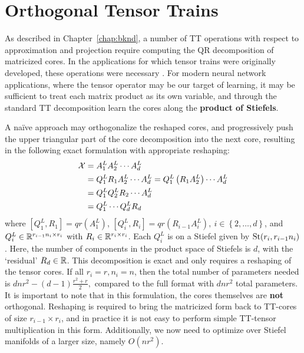 \section{Orthogonal Tensor Trains}\label{sec:ott}
As described in Chapter~\ref{chap:bknd}, a number of TT operations with respect to approximation and projection require computing the QR decomposition of matricized cores. In the applications for which tensor trains were originally developed, these operations were necessary \citep{oseledets2011tensor,klus2018tensor}. For modern neural network applications, where the tensor operator may be our target of learning, it may be sufficient to treat each matrix product as its own variable, and through the standard TT decomposition learn the cores along the \textbf{product of Stiefels}.

A na\"ive approach may orthogonalize the reshaped cores, and progressively push the upper triangular part of the core decomposition into the next core, resulting in the following exact formulation with appropriate reshaping:
\begin{align}
    \mathcal{X} &= A_1^L A_2^L\cdots A_d^L \nonumber\\
    &= Q_1^L R_1 A_2^L \cdots A_d^L = Q_1^L \left(R_1 A_2^L\right) \cdots A_d^L \nonumber\\ 
    &= Q_1^L Q_2^L R_2 \cdots A_d^L \nonumber\\
    &= Q_1^L \cdots Q_d^L R_d \label{eq:eott}
\end{align}
where $ [Q_1^L, R_1] = qr(A_1^L) $, $ [Q_i^L, R_i] = qr(R_{i-1} A_i^L ), \ i \in \left \{2,\ldots,d \right \}$, and $ Q_i^L \in \mathbb{R}^{r_{i-1} n_i \times r_i}$ with $R_i \in \mathbb{R}^{r_i \times r_i}$. 
Each $Q_i^L$ is on a Stiefel given by $\text{St}(r_i, r_{i-1}n_i)$. Here, the number of components in the product space of Stiefels is $d$, with the `residual' $R_d \in \mathbb{R}$. This decomposition is exact and only requires a reshaping of the tensor cores.
If all $r_i = r, n_i = n$,
then the total number of parameters needed is
$    d n r^2 - (d-1)\frac{r^2 + r}{2},$
compared to the full format with $dnr^2$ total parameters.
It is important to note that in this formulation, the cores themselves are \textbf{not} orthogonal. Reshaping is required to bring the matricized form back to TT-cores of size $r_{i-1} \times r_i$, and in practice it is not easy to perform simple TT-tensor multiplication in this form. Additionally, we now need to optimize over Stiefel manifolds of a larger size, namely $O(nr^2)$.

